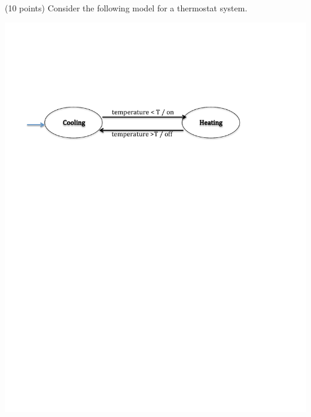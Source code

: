 \documentclass[a4paper, 12pt]{article}
\begin{document}
\begin{problem}{}
(10 points)
Consider the following model for a thermostat system.

\begin{center}
\includegraphics[scale=0.5]{temperature.pdf}
\end{center}


\end{problem}
\end{document}
